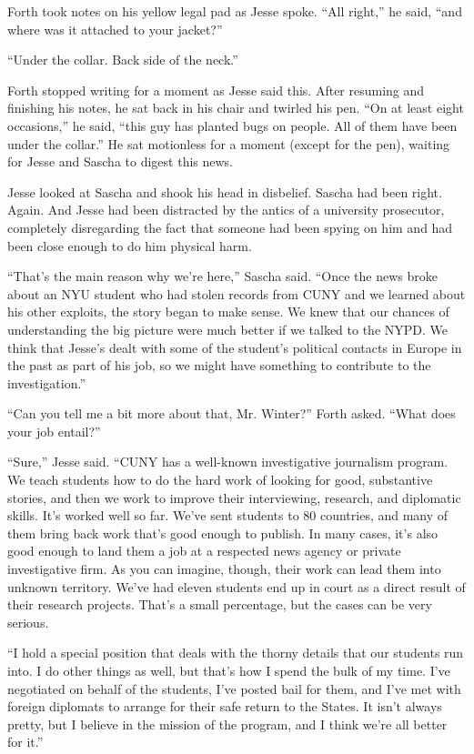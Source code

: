 \documentclass[12pt]{book}
\begin{document}
Forth took notes on his yellow legal pad as Jesse spoke.  ``All right,'' he said, ``and where was it attached to your jacket?''

``Under the collar.  Back side of the neck.''

Forth stopped writing for a moment as Jesse said this.  After resuming and finishing his notes, he sat back in his chair and twirled his pen.  ``On at least eight occasions,'' he said, ``this guy has planted bugs on people.  All of them have been under the collar.''  He sat motionless for a moment (except for the pen), waiting for Jesse and Sascha to digest this news.

Jesse looked at Sascha and shook his head in disbelief.  Sascha had been right.  Again.  And Jesse had been distracted by the antics of a university prosecutor, completely disregarding the fact that someone had been spying on him and had been close enough to do him physical harm.

``That's the main reason why we're here,'' Sascha said.  ``Once the news broke about an NYU student who had stolen records from CUNY and we learned about his other exploits, the story began to make sense.  We knew that our chances of understanding the big picture were much better if we talked to the NYPD.  We think that Jesse's dealt with some of the student's political contacts in Europe in the past as part of his job, so we might have something to contribute to the investigation.''

``Can you tell me a bit more about that, Mr. Winter?'' Forth asked.  ``What does your job entail?''

``Sure,'' Jesse said.  ``CUNY has a well-known investigative journalism program.  We teach students how to do the hard work of looking for good, substantive stories, and then we work to improve their interviewing, research, and diplomatic skills.  It's worked well so far.  We've sent students to 80 countries, and many of them bring back work that's good enough to publish.  In many cases, it's also good enough to land them a job at a respected news agency or private investigative firm.  As you can imagine, though, their work can lead them into unknown territory.  We've had eleven students end up in court as a direct result of their research projects.  That's a small percentage, but the cases can be very serious.

``I hold a special position that deals with the thorny details that our students run into.  I do other things as well, but that's how I spend the bulk of my time.  I've negotiated on behalf of the students, I've posted bail for them, and I've met with foreign diplomats to arrange for their safe return to the States.  It isn't always pretty, but I believe in the mission of the program, and I think we're all better for it.''
\end{document}
